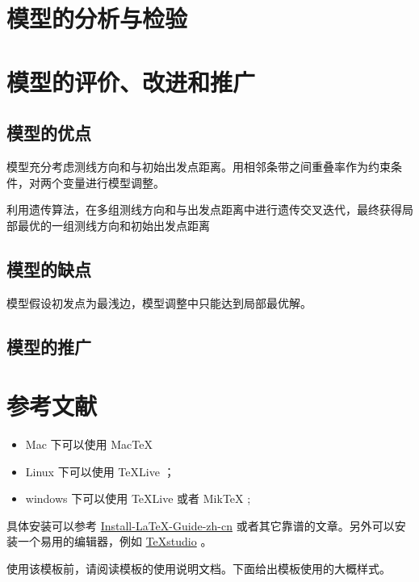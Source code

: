 \documentclass[withoutpreface,bwprint]{cumcmthesis} %
\begin{document}
\section{模型的分析与检验}
\section{模型的评价、改进和推广}
\subsection{模型的优点}
模型充分考虑测线方向和与初始出发点距离。用相邻条带之间重叠率作为约束条件，对两个变量进行模型调整。

利用遗传算法，在多组测线方向和与出发点距离中进行遗传交叉迭代，最终获得局部最优的一组测线方向和初始出发点距离
\subsection{模型的缺点}
模型假设初发点为最浅边，模型调整中只能达到局部最优解。
\subsection{模型的推广}
\section{参考文献}
\begin{itemize}
    \item Mac 下可以使用 Mac\TeX{}
    \item Linux 下可以使用 \TeX{}Live ；
    \item windows 下可以使用 \TeX{}Live 或者 Mik\TeX{} ;
\end{itemize}

具体安装可以参考 \href{https://github.com/OsbertWang/install-latex-guide-zh-cn/releases/}{Install-LaTeX-Guide-zh-cn} 或者其它靠谱的文章。另外可以安装一个易用的编辑器，例如 \href{https://mirrors.tuna.tsinghua.edu.cn/github-release/texstudio-org/texstudio/LatestRelease/}{\TeX{}studio} 。

使用该模板前，请阅读模板的使用说明文档。下面给出模板使用的大概样式。
\end{document}
